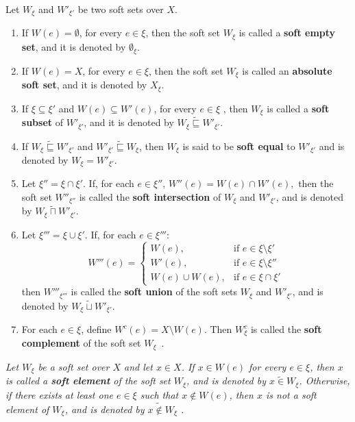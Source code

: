 \documentclass[preprint,12pt]{elsarticle}
\begin{document}
\begin{defn}\label{}
\em{ Let \( W_\xi \) and \( W'_{\xi'} \) be two soft sets over  \( X \).
 \begin{enumerate}
  \item If \( W(e) = \emptyset \), for every \( e \in \xi \), then the soft set $W_\xi$ is called a \textbf{soft empty set}, and it is denoted by \( \emptyset_\xi \).
  \item If \( W(e) = X \), for every \( e \in \xi \), then the soft set $W_\xi$ is called an \textbf{absolute soft set}, and it is denoted by \( X_\xi \).
  \item If \( \xi \subseteq \xi' \) and \( W(e) \subseteq W'(e) \), for every \( e\in \xi \) , then \( W_{\xi} \) is called a \textbf{soft subset} of \( W'_{\xi'} \), and it is denoted by \( W_{\xi}  \widetilde{\sqsubseteq} W'_{\xi'}\).
   \item If  \(W_{\xi}  \widetilde{\sqsubseteq}W'_{\xi'} \) and  \(W'_{\xi'}  \widetilde{\sqsubseteq}W_{\xi}\), then \( W_{\xi} \) is said to be \textbf{soft equal} to \( W'_{\xi'} \) and  is denoted by
\(W_{\xi} = W'_{\xi'}\).
  \item Let \( \xi'' = \xi \cap \xi' \).
If, for each \( e \in \xi'' \), \(
W''(e) = W(e) \cap W'(e),
\) then the soft set \( W''_{\xi''} \) is called the \textbf{soft intersection} of \( W_\xi \) and \( W'_{\xi'} \),
and is denoted by \( W_\xi  \widetilde{\sqcap} W'_{\xi'} \).
  \item Let \( \xi''' = \xi \cup \xi' \).
If, for each \( e \in \xi''' \):
\[
W'''(e) =
\begin{cases}
W(e), & \text{if } e \in \xi \setminus \xi' \\
W'(e), & \text{if } e \in \xi \setminus \xi'' \\
W(e) \cup W(e), & \text{if } e \in \xi \cap \xi'
\end{cases}
\]then \( W'''_{\xi'''} \) is called the \textbf{soft union} of the soft sets \( W_\xi \) and \( W'_{\xi'} \),
and is denoted by \( W_\xi  \widetilde{\sqcup} W'_{\xi'} \).
\item  For each \( e \in \xi \), define \(
W^c(e) = X \setminus W(e)
\). Then \( {W_\xi^c} \) is called the \textbf{soft complement} of the soft set \( W_\xi \)~\cite{Maji}.
\end{enumerate}
}
\end{defn}


\begin{defn}
\em{
Let \( W_\xi \) be a soft set over  \( X \) and let \( x \in X \).
If \( x \in W(e) \) for every \( e \in \xi \), then \( x \) is called a \textbf{soft element} of the soft set \( W_\xi \), and is denoted by
\(
x \widetilde{\in}W_\xi
\).
Otherwise, if there exists at least one \( e \in \xi \) such that \( x \notin W(e) \), then \( x \) is not a soft element of \( W_\xi \), and is denoted by
\(
x \widetilde{\notin}W_\xi
\)
\cite{Naz}.
}
\end{defn}
\end{document}

